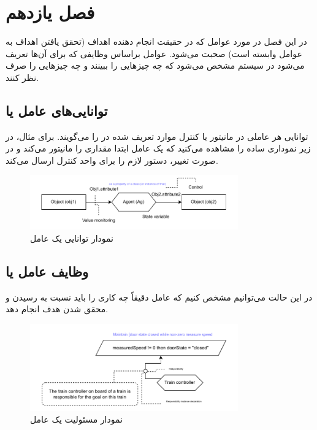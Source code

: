 \newpage

\section{فصل یازدهم}

در این فصل در مورد عوامل که در حقیقت انجام دهنده اهداف (تحقق یافتن اهداف به
عوامل وابسته است) صحبت می‌شود. عوامل براساس وظایفی که برای آن‌ها تعریف می‌شود در
سیستم مشخص می‌شود که چه چیز‌هایی را ببینند و چه چیز‌هایی را صرف نظر کنند.

\subsection{توانایی‌های عامل یا }

توانایی هر عاملی در مانیتور یا کنترل موارد تعریف شده در  را
می‌گویند. برای مثال، در زیر نموداری ساده را مشاهده می‌کنید که یک عامل ابتدا
مقداری را مانیتور می‌کند و در صورت تغییر، دستور لازم را برای واحد کنترل ارسال
می‌کند.

\begin{figure}[H]
    \centering
    \includegraphics[width=0.8\textwidth]{assets/agent_capabilities.drawio.pdf}
    \caption{نمودار توانایی یک عامل}
\end{figure}

\subsection{وظایف عامل یا }

در این حالت می‌توانیم مشخص کنیم که عامل دقیقاً چه کاری را باید نسبت به رسیدن و
محقق شدن هدف انجام دهد.

\begin{figure}[H]
    \centering
    \includegraphics[width=0.8\textwidth]{assets/agent_responsibilities.drawio.pdf}
    \caption{نمودار مسئولیت یک عامل}
\end{figure}

